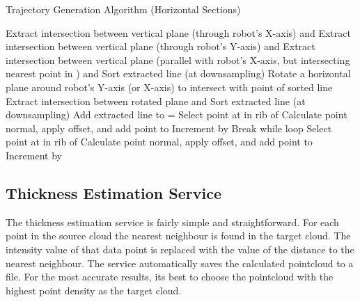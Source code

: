 \begin{spacing}{0.8}
\begin{algorithm}[H]
\caption{Trajectory Generation Algorithm (Horizontal Sections)}
\label{alg:trajh}
\begin{algorithmic}[1]
\begin{raggedright}
\State Extract intersection between vertical plane (through robot's X-axis) and 
\State Extract intersection between vertical plane (through robot's Y-axis) and 
\EndIf
{}
\State Extract intersection between vertical plane (parallel with robot's X-axis, but intersecting
\EndIf nearest point in ) and 
\State Sort extracted line (at  downsampling)
\State Rotate a horizontal plane around robot's Y-axis (or X-axis) to intersect with point  of sorted line
\State Extract intersection between rotated plane and 
\State Sort extracted line (at  downsampling)
\State Add extracted line to 
\EndFor
\State {} = 
\State Select point at  in rib  of 
\State Calculate point normal, apply offset, and add point to 
\EndFor
\State Increment  by 
\State Break while loop
\EndIf
{}
\State Select point at  in rib  of 
\State Calculate point normal, apply offset, and add point to 
\EndFor
\State Increment  by 
\EndWhile
\EndFunction\\
\Return {}
\end{raggedright}
\end{algorithmic}
\end{algorithm}
\end{spacing}
\subsection{Thickness Estimation Service}

The thickness estimation service is fairly simple and straightforward. For each point in the source cloud the nearest neighbour is found in the target cloud. The intensity value of that data point is replaced with the value of the distance to the nearest neighbour. The service automatically saves the calculated pointcloud to a file. For the most accurate results, its best to choose the pointcloud with the highest point density as the target cloud.\\

